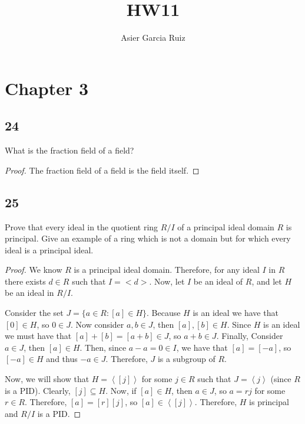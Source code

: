 \documentclass{article}
\title{HW11}
\author{Asier Garcia Ruiz}
\newcommand{\gen}[1]{\left\langle #1 \right\rangle}
\newenvironment{hwproof}[1]
{
    #1
    \begin{proof}
}{
    \end{proof}
}
\begin{document}
\maketitle
\section*{Chapter 3}
\subsection*{24}
\begin{hwproof}
    {
        What is the fraction field of a field?
    }
    The fraction field of a field is the field itself.
\end{hwproof}

\subsection*{25}
\begin{hwproof}
    {
        Prove that every ideal in the quotient ring $R/I$ of a principal ideal
        domain $R$ is principal. Give an example of a ring which is not a
        domain but for which every ideal is a principal ideal.
    }
    We know $R$ is a principal ideal domain. Therefore, for any ideal $I$ in $R$
    there exists $d \in R$ such that $I = <d>$. Now, let $I$ be an ideal of $R$, 
    and let $H$ be an ideal in $R/I$. 
    
    Consider the set $J = \{a \in R : [a] \in H\}$. Because $H$ is an ideal
    we have that $[0] \in H$, so $0 \in J$. Now consider $a,b \in J$, then
    $[a], [b] \in H$. Since $H$ is an ideal we must have that
    $[a]+[b] = [a+b] \in J$, so $a + b \in J$. Finally, Consider $a \in J$,
    then $[a] \in H$. Then, since $a - a = 0 \in I$, we have that
    $[a] = [-a]$, so $[-a] \in H$ and thus $-a \in J$. Therefore,
    $J$ is a subgroup of $R$.

    Now, we will show that $H = \gen{[j]}$ for some $j \in R$ such that 
    $J = \gen{j}$ (since $R$ is a PID). Clearly, $[j] \subseteq H$.
    Now, if $[a] \in H$, then $a \in J$, so $a = rj$ for some $r \in R$.
    Therefore, $[a] = [r][j]$, so $[a]\in \gen{[j]}$.
    Therefore, $H$ is principal and $R/I$ is a PID.
\end{hwproof}
\end{document}
